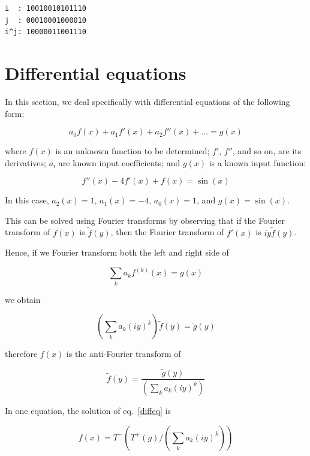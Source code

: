 \documentclass[justified,sixbynine]{tufte-book}
\theoremstyle{plain}%
\theoremstyle{definition}
\theoremstyle{remark}
\begin{document}
\begin{fullwidth}
\begin{lstlisting}
i  : 10010010101110
j  : 00010001000010
i^j: 10000011001110
\end{lstlisting}

\section{Differential equations}

In this section, we deal specifically with differential equations of the following form:

\begin{equation}
a_0 f(x) + a_1 f'(x) + a_2 f''(x) + \dots = g(x) \label{diffeq}
\end{equation}

where $f(x)$ is an unknown function to be determined; $f'$, $f''$, and so on, are its derivatives; $a_i$ are known input coefficients; and $g(x)$ is a known input function:

\begin{equation}
f''(x) - 4 f'(x) + f(x) = \sin(x)
\end{equation}

In this case, $a_2(x) = 1$, $a_1(x) = -4$, $a_0(x) = 1$, and $g(x) = \sin(x)$.

This can be solved using Fourier transforms by observing that if the Fourier transform of $f(x)$ is $\tilde f(y)$, then the Fourier transform of $f'(x)$ is $iy\tilde f(y)$.

Hence, if we Fourier transform both the left and right side of

\begin{equation}
\sum _k a_k f^{(k)}(x) = g(x)
\end{equation}

we obtain

\begin{equation}
(\sum _k a_k (i y)^k) \tilde f(y) = \tilde g(y)
\end{equation}

therefore $f(x)$ is the anti-Fourier transform of

\begin{equation}
\tilde f(y) = \frac{\tilde g(y)}{(\sum _k a_k (i y)^k)}
\end{equation}

In one equation, the solution of eq.~\ref{diffeq} is

\begin{equation}
f(x) = T^-(T^+(g)/(\sum _k a_k (iy)^k))
\end{equation}


\end{fullwidth}
\end{document}
